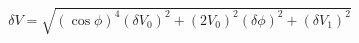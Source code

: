 \begin{equation}
\label{eq:delta_V_Malus}
\delta V = \sqrt{ \left(\cos{\phi}\right)^4(\delta V_0)^2 + \left(2V_0 \right)^2(\delta \phi)^2+ (\delta V_1)^2}
\end{equation}